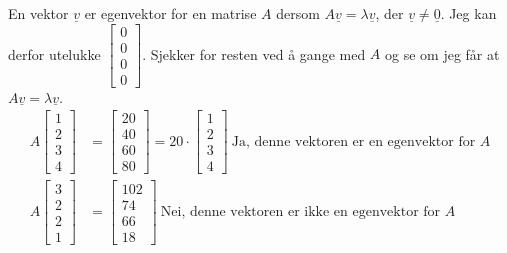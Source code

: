 \documentclass[11pt, a4paper, norsk]{NTNUoving}
\begin{document}
\begin{oppgave}
\begin{punkt}
            En vektor $\underline{v}$ er egenvektor for en matrise $A$ dersom $A\underline{v} = \lambda\underline{v}$, der $\underline{v} \neq \underline{0}$. Jeg kan derfor utelukke $\begin{bmatrix}
                0 \\
                0 \\
                0 \\
                0
            \end{bmatrix}$. Sjekker for resten ved å gange med $A$ og se om jeg får at $A\underline{v} = \lambda\underline{v}$.
            \begin{align*}
                A\begin{bmatrix}
                    1 \\
                    2 \\
                    3 \\
                    4
                \end{bmatrix} &= \begin{bmatrix}
                    20 \\
                    40 \\
                    60 \\
                    80
                \end{bmatrix} = 20 \cdot \begin{bmatrix}
                    1 \\
                    2 \\
                    3 \\
                    4
            \end{bmatrix} \: \text{Ja, denne vektoren er en egenvektor for } A
            \\
            A\begin{bmatrix}
                3 \\
                2 \\
                2 \\
                1
            \end{bmatrix} &= \begin{bmatrix}
                102 \\
                74 \\
                66 \\
                18
        \end{bmatrix} \: \text{Nei, denne vektoren er ikke en egenvektor for } A                \\

\end{align*}
\end{punkt}
\end{oppgave}
\end{document}
